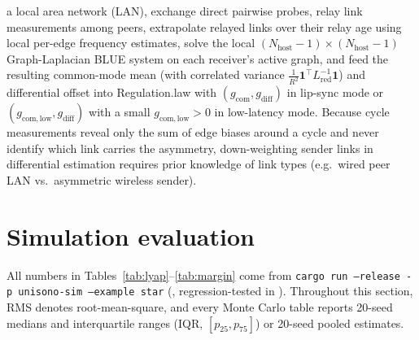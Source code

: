 \documentclass[11pt,a4paper]{article}
\DeclareRobustCommand{\lean}[1]{{\ttfamily\def\_{\textunderscore\allowbreak}#1}}
\theoremstyle{definition}
\begin{document}
\begin{enumerate}
  a local area network (LAN), exchange direct pairwise probes, relay link
  measurements among peers, extrapolate relayed links over their relay age
  using local per-edge frequency estimates, solve the local
  $(N_{\mathrm{host}}{-}1)\times(N_{\mathrm{host}}{-}1)$ Graph-Laplacian BLUE
  system on each receiver's active graph, and feed the resulting common-mode
  mean (with correlated variance
  $\frac{1}{R^2}\mathbf{1}^\top L_{\mathrm{red}}^{-1}\mathbf{1}$) and
  differential offset into \lean{Regulation.law} with
  $(g_{\mathrm{com}}, g_{\mathrm{diff}})$ in lip-sync mode or
  $(g_{\mathrm{com,low}}, g_{\mathrm{diff}})$ with a small
  $g_{\mathrm{com,low}} > 0$ in low-latency mode. Because cycle measurements
  reveal only the sum of edge biases around a cycle and never identify which
  link carries the asymmetry, down-weighting sender links in differential
  estimation requires prior knowledge of link types (e.g.\ wired peer LAN vs.\
  asymmetric wireless sender).
\end{enumerate}

\section{Simulation evaluation}
\label{sec:sim}

All numbers in Tables~\ref{tab:lyap}--\ref{tab:margin} come from
\texttt{cargo run --release -p unisono-sim --example star}
(, regression-tested in
). Throughout this section, RMS denotes
root-mean-square, and every Monte Carlo table reports 20-seed medians and
interquartile ranges (IQR, $[p_{25}, p_{75}]$) or 20-seed pooled estimates.
\end{document}
